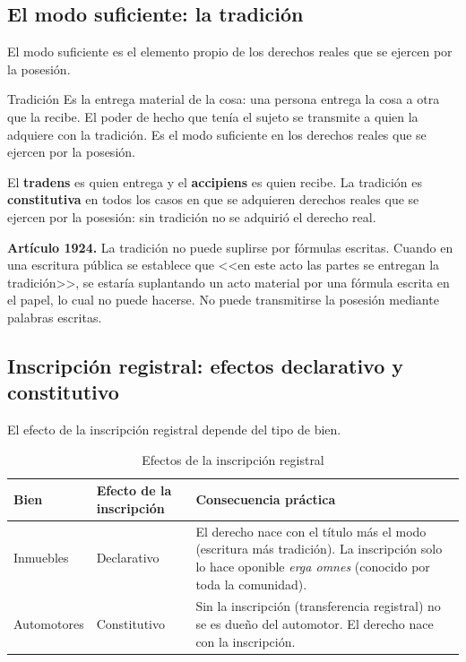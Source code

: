 \documentclass[12pt,oneside]{book}
\begin{document}
\subsection{El modo suficiente: la tradición}

El modo suficiente es el elemento propio de los derechos reales que se ejercen por la posesión.

\begin{definition}{Tradición}
Es la entrega material de la cosa: una persona entrega la cosa a otra que la recibe. El poder de hecho que tenía el sujeto se transmite a quien la adquiere con la tradición. Es el modo suficiente en los derechos reales que se ejercen por la posesión.
\end{definition}

El \textbf{tradens} es quien entrega y el \textbf{accipiens} es quien recibe. La tradición es \textbf{constitutiva} en todos los casos en que se adquieren derechos reales que se ejercen por la posesión: sin tradición no se adquirió el derecho real.

\begin{important}
\textbf{Artículo 1924.} La tradición no puede suplirse por fórmulas escritas. Cuando en una escritura pública se establece que <<en este acto las partes se entregan la tradición>>, se estaría suplantando un acto material por una fórmula escrita en el papel, lo cual no puede hacerse. No puede transmitirse la posesión mediante palabras escritas.
\end{important}

\subsection{Inscripción registral: efectos declarativo y constitutivo}

El efecto de la inscripción registral depende del tipo de bien.

\begin{table}[H]
\centering
\small
\begin{tabularx}{\textwidth}{>{\raggedright\arraybackslash}p{}>{\raggedright\arraybackslash}p{}>{\raggedright\arraybackslash}X}
\toprule
\textbf{Bien} & \textbf{Efecto de la inscripción} & \textbf{Consecuencia práctica} \\
\midrule
Inmuebles & Declarativo &
El derecho nace con el título más el modo (escritura más tradición). La inscripción solo lo hace oponible \textit{erga omnes} (conocido por toda la comunidad). \\[0.5em]
Automotores & Constitutivo &
Sin la inscripción (transferencia registral) no se es dueño del automotor. El derecho nace con la inscripción. \\
\bottomrule
\end{tabularx}
\caption{Efectos de la inscripción registral}
\end{table}
\end{document}
